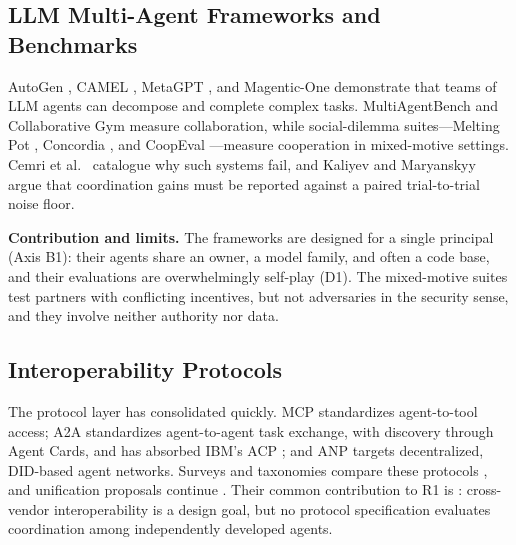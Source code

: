 \documentclass[conference]{IEEEtran}
\newcommand{\half}{{\small\LEFTcircle}}
\begin{document}
\subsection{LLM Multi-Agent Frameworks and Benchmarks}\label{sec-6-3}

AutoGen \cite{wu2023autogen}, CAMEL \cite{li2023camel}, MetaGPT \cite{hong2023metagpt}, and Magentic-One \cite{fourney2024magenticone} demonstrate that teams of LLM agents can decompose and complete complex tasks. MultiAgentBench \cite{zhu2025multiagentbench} and Collaborative Gym \cite{shao2024cogym} measure collaboration, while social-dilemma suites---Melting Pot \cite{leibo2021meltingpot}, Concordia \cite{vezhnevets2023concordia, smith2025concordiagen}, and CoopEval \cite{tewolde2026coopeval}---measure cooperation in mixed-motive settings. Cemri et al.~\cite{cemri2025mast} catalogue why such systems fail, and Kaliyev and Maryanskyy~\cite{kaliyev2026noisefloor} argue that coordination gains must be reported against a paired trial-to-trial noise floor.

\textbf{Contribution and limits.} The frameworks are designed for a single principal (Axis B1): their agents share an owner, a model family, and often a code base, and their evaluations are overwhelmingly self-play (D1). The mixed-motive suites test partners with conflicting incentives, but not adversaries in the security sense, and they involve neither authority nor data.

\subsection{Interoperability Protocols}\label{sec-6-4}

The protocol layer has consolidated quickly. MCP \cite{anthropic2024mcp} standardizes agent-to-tool access; A2A \cite{google2025a2a} standardizes agent-to-agent task exchange, with discovery through Agent Cards, and has absorbed IBM's ACP \cite{beeai2025acp}; and ANP \cite{chang2025anp} targets decentralized, DID-based agent networks. Surveys and taxonomies compare these protocols \cite{ehtesham2025survey, sander2026taxonomy, du2025internet}, and unification proposals continue \cite{krishnan2026unified}. Their common contribution to R1 is \half{}: cross-vendor interoperability is a design goal, but no protocol specification evaluates coordination among independently developed agents.
\end{document}
